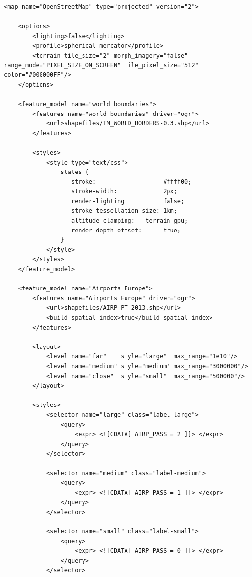 \begin{lstlisting}
<map name="OpenStreetMap" type="projected" version="2">

    <options>
        <lighting>false</lighting>
        <profile>spherical-mercator</profile>
        <terrain tile_size="2" morph_imagery="false" range_mode="PIXEL_SIZE_ON_SCREEN" tile_pixel_size="512" color="#000000FF"/>
    </options>
    
    <feature_model name="world boundaries">
        <features name="world boundaries" driver="ogr">
            <url>shapefiles/TM_WORLD_BORDERS-0.3.shp</url>
        </features>       
        
        <styles>
            <style type="text/css">
                states {
                   stroke:                   #ffff00;
                   stroke-width:             2px;
                   render-lighting:          false;
                   stroke-tessellation-size: 1km;
                   altitude-clamping:   terrain-gpu;
                   render-depth-offset:      true;     
                }                    
            </style>
        </styles>        
    </feature_model>
    
    <feature_model name="Airports Europe">
        <features name="Airports Europe" driver="ogr">
            <url>shapefiles/AIRP_PT_2013.shp</url>
            <build_spatial_index>true</build_spatial_index>
        </features>       
        
        <layout>
            <level name="far"    style="large"  max_range="1e10"/>
            <level name="medium" style="medium" max_range="3000000"/>
            <level name="close"  style="small"  max_range="500000"/>
        </layout>

        <styles>
            <selector name="large" class="label-large">
                <query>
                    <expr> <![CDATA[ AIRP_PASS = 2 ]]> </expr>
                </query>
            </selector>
            
            <selector name="medium" class="label-medium">
                <query>
                    <expr> <![CDATA[ AIRP_PASS = 1 ]]> </expr>
                </query>
            </selector>
            
            <selector name="small" class="label-small">
                <query>
                    <expr> <![CDATA[ AIRP_PASS = 0 ]]> </expr>
                </query>
            </selector>
            

\end{lstlisting}
